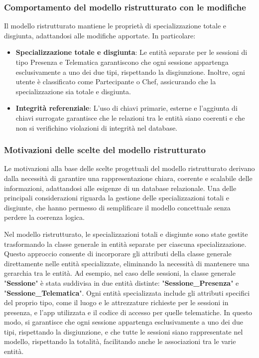 \subsubsection{Comportamento del modello ristrutturato con le modifiche}
Il modello ristrutturato mantiene le proprietà di specializzazione totale e disgiunta, adattandosi alle modifiche apportate. In particolare:
\begin{itemize}
    \item \textbf{Specializzazione totale e disgiunta}: Le entità separate per le sessioni di tipo Presenza e Telematica garantiscono che ogni sessione appartenga esclusivamente a uno dei due tipi, rispettando la disgiunzione. Inoltre, ogni utente è classificato come Partecipante o Chef, assicurando che la specializzazione sia totale e disgiunta.
    \item \textbf{Integrità referenziale}: L'uso di chiavi primarie, esterne e l'aggiunta di chiavi surrogate garantisce che le relazioni tra le entità siano coerenti e che non si verifichino violazioni di integrità nel database.
\end{itemize}

\subsubsection{Motivazioni delle scelte del modello ristrutturato}
Le motivazioni alla base delle scelte progettuali del modello ristrutturato derivano dalla necessità di garantire una rappresentazione chiara, coerente e scalabile delle informazioni, adattandosi alle esigenze di un database relazionale. Una delle principali considerazioni riguarda la gestione delle specializzazioni totali e disgiunte, che hanno permesso di semplificare il modello concettuale senza perdere la coerenza logica.

Nel modello ristrutturato, le specializzazioni totali e disgiunte sono state gestite trasformando la classe generale in entità separate per ciascuna specializzazione. Questo approccio consente di incorporare gli attributi della classe generale direttamente nelle entità specializzate, eliminando la necessità di mantenere una gerarchia tra le entità. Ad esempio, nel caso delle sessioni, la classe generale "\textbf{Sessione}" è stata suddivisa in due entità distinte: "\textbf{Sessione\_Presenza}" e "\textbf{Sessione\_Telematica}". Ogni entità specializzata include gli attributi specifici del proprio tipo, come il luogo e le attrezzature richieste per le sessioni in presenza, e l'app utilizzata e il codice di accesso per quelle telematiche. In questo modo, si garantisce che ogni sessione appartenga esclusivamente a uno dei due tipi, rispettando la disgiunzione, e che tutte le sessioni siano rappresentate nel modello, rispettando la totalità, facilitando anche le associazioni tra le varie entità.

